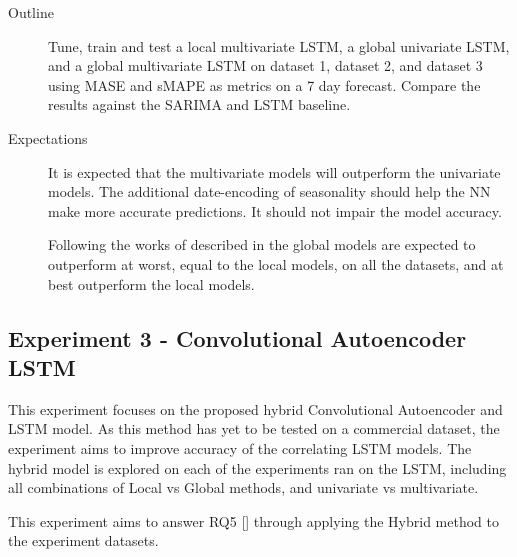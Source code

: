 \begin{description}
  \item[Outline]{
              Tune, train and test a local multivariate LSTM, a global univariate LSTM,
              and a global multivariate LSTM on dataset 1,
              dataset 2, and dataset 3 using MASE and sMAPE as metrics on a 7 day forecast.
              Compare the results against the SARIMA and LSTM baseline.
        }
\end{description}

\begin{description}
  \item[Expectations]{
              It is expected that the multivariate models will outperform the univariate models.
              The additional date-encoding of seasonality should help the NN make more accurate predictions.
              It should not impair the model accuracy.

              Following the works of \cite{Montero-Manso2021} described in 
              the global models are expected to outperform at worst, equal to the local models, on all the datasets, and at best outperform the local models.

        }
\end{description}

\subsection{Experiment 3 - Convolutional Autoencoder LSTM}
This experiment focuses on the proposed hybrid Convolutional Autoencoder and LSTM model.
As this method has yet to be tested on a commercial dataset,
the experiment aims to improve accuracy of the correlating LSTM models.
The hybrid model is explored on each of the experiments ran on the LSTM,
including all combinations of Local vs Global methods, and univariate vs multivariate.

This experiment aims to answer RQ5 [] through applying the Hybrid method
to the experiment datasets.


